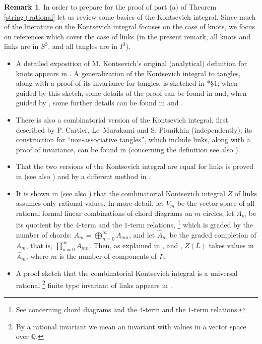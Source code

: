 \documentclass[a4paper,12pt,reqno,oneside]{amsart} %
\theoremstyle{plain}
\theoremstyle{definition}
\newtheorem{remark}[theorem]{Remark}
\theoremstyle{named}
\renewcommand{\:}{\colon}
\def\Q{\mathbb{Q}}
\begin{document}
\begin{remark} \label{kontsevich}
In order to prepare for the proof of part (a) of Theorem \ref{string+rational} let us review some basics of 
the Kontsevich integral.
Since much of the literature on the Kontsevich integral focuses on the case of knots, we focus on references 
which cover the case of links (in the present remark, all knots and links are in $S^3$, and all tangles are in $I^3$).
\begin{itemize} 
\item A detailed exposition of M. Kontsevich's original (analytical) definition for knots appears in \cite{CDM}.
A generalization of the Kontsevich integral to tangles, along with a proof of its invariance for tangles, 
is sketched in \cite{LM1}*{\S1}; when guided by this sketch, some details of the proof can be found in \cite{BN} 
and, when guided by \cite{BN}, some further details can be found in \cite{CDM} and \cite{ChD}.
\item There is also a combinatorial version of the Kontsevich integral, first described by 
P. Cartier, Le--Murakami and S. Piunikhin (independently); its construction for ``non-associative tangles'', which include links, 
along with a proof of invariance, can be found in \cite{BN2} (concerning the definition see also \cite{CDM}).
\item That the two versions of the Kontsevich integral are equal for links is proved in \cite{LM1} (see also \cite{CDM}) 
and by a different method in \cite{AF}.
\item It is shown in \cite{LM2} (see also \cite{CDM}) that the combinatorial Kontsevich integral $Z$ of links assumes only 
rational values.
In more detail, let $V_m$ be the vector space of all rational formal linear combinations of chord diagrams on $m$ circles,
let $A_m$ be its quotient by the $4$-term and the $1$-term relations,%
\footnote{See \cite{CDM} concerning chord diagrams and the $4$-term and the $1$-term relations.}
which is graded by the number of chords: 
$A_m=\bigoplus_{n=0}^\infty A_{mn}$, and let $\hat A_m$ be the graded completion of $A_m$, that is, $\prod_{n=0}^\infty A_{mn}$.
Then, as explained in \cite{LM1}, \cite{LM2} and \cite{HaMa}, $Z(L)$ takes values in $\hat A_m$, where $m$ is the number
of components of $L$.
\item A proof sketch that the combinatorial Kontsevich integral is a universal rational%
\footnote{By a rational invariant we mean an invariant with values in a vector space over $\Q$.}
finite type invariant of links appears in \cite{BN2}.

\end{itemize}
\end{remark}
\end{document}
